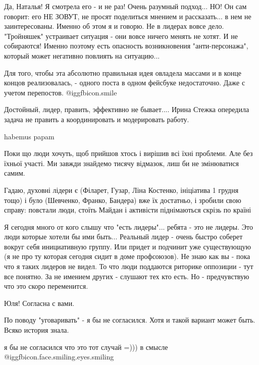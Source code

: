 \begin{itemize}

Да, Наталья! Я смотрела его - и не раз! Очень разумный подход... НО! Он сам
говорит: его НЕ ЗОВУТ, не просят поделиться мнением и рассказать... в нем не
заинтересованы. Именно об этом я и говорю. Не в лидерах вовсе дело. "Тройняшек"
устраивает ситуация - они вовсе ничего менять не хотят. И не собираются! Именно
поэтому есть опасность возникновения "анти-персонажа", который может негативно
повлиять на ситуацию...


Для того, чтобы эта абсолютно правильная идея овладела массами и в конце концов
реализовалась, - одного поста в одном фейсбуке недостаточно. Даже с учетом
перепостов. @igg{fbicon.smile} 


Достойный, лидер, править, эффективно не бывает.... Ирина Стежка опередила
задача не править а координировать и модерировать работу.

habemus papam


Поки що люди хочуть, щоб прийшов хтось і вирішив всі їхні проблеми. Але без
їхньої участі. Ми завжди знайдемо тисячу відмазок, лиш би не змінюватися самим.


Гадаю, духовні лідери є (Філарет, Гузар, Ліна Костенко, ініціатива 1 грудня
тощо) і було (Шевченко, Франко, Бандера) вже їх достатньо, і зробили свою
справу: повстали люди, стоїть Майдан і активісти піднімаються скрізь по країні


Я сегодня много от кого слышу что "есть лидеры"... ребята - это не лидеры. Это
люди которые хотели бы ими быть... Реальный лидер - очень быстро соберет вокруг
себя инициативную группу. Или придет и подчинит уже существующую (я не про ту
которая сегодня сидит в доме профсоюзов). Не знаю как вы - пока что я таких
лидеров не видел. То что люди поддаются риторике оппозиции - тут все понятно.
За не имением других - слушают тех кто есть. Но - предчувствую что это скоро
переменится.

Юля! Согласна с вами.

По поводу "уговаривать" - я бы не согласился. Хотя и такой вариант может быть. Всяко история знала.

я бы не согласился что это тот случай =))) в смысле  @igg{fbicon.face.smiling.eyes.smiling} 


\end{itemize}

